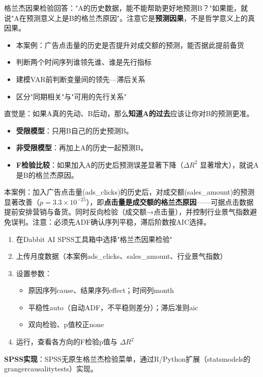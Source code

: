 
\begin{algointro}
格兰杰因果检验回答："A的历史数据，能不能帮助更好地预测B？"如果能，就说"A在预测意义上是B的格兰杰原因"。注意它是\textbf{预测因果}，不是哲学意义上的真因果。
\end{algointro}

\begin{algoscene}
\begin{itemize}
    \item 本案例：广告点击量的历史是否提升对成交额的预测，能否据此提前备货
    \item 判断两个时间序列谁领先谁、谁是先行指标
    \item 建模VAR前判断变量间的领先—滞后关系
    \item 区分"同期相关"与"可用的先行关系"
\end{itemize}
\end{algoscene}

\begin{algoprinciple}
直觉是：如果A真的先动、B后动，那么\textbf{知道A的过去}应该让你对B的预测更准。

\begin{itemize}
    \item \textbf{受限模型}：只用B自己的历史预测B。
    \item \textbf{非受限模型}：再加上A的历史一起预测B。
    \item \textbf{F检验比较}：如果加入A的历史后预测误差显著下降（$\Delta R^2$ 显著增大），就说A是B的格兰杰原因。
\end{itemize}

本案例：加入广告点击量(ads\_clicks)的历史后，对成交额(sales\_amount)的预测显著改善（$p=3.3\times10^{-25}$），即\textbf{点击量是成交额的格兰杰原因}——可据点击数据提前安排营销与备货。同时反向检验（成交额→点击量），并控制行业景气指数避免误判。注意：必须先ADF确认序列平稳，滞后阶数按AIC选择。
\end{algoprinciple}

\begin{algosposs}
\begin{enumerate}
    \item 在Dabbit AI SPSS工具箱中选择"格兰杰因果检验"
    \item 上传月度数据（本案例ads\_clicks、sales\_amount、行业景气指数）
    \item 设置参数：
    \begin{itemize}
        \item 原因序列cause、结果序列effect；时间列month
        \item 平稳性auto（自动ADF，不平稳则差分）；滞后准则aic
        \item 双向检验、p值校正none
    \end{itemize}
    \item 运行，查看各方向的F检验p值与 $\Delta R^2$
\end{enumerate}

\textbf{SPSS实现}：SPSS无原生格兰杰检验菜单，通过R/Python扩展（statsmodels的grangercausalitytests）实现。
\end{algosposs}

